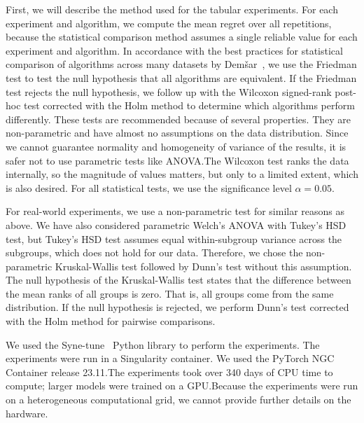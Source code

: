  First, we will describe the method used for the tabular experiments. For each experiment and algorithm, we compute the mean regret over all repetitions, because the statistical comparison method assumes a single reliable value for each experiment and algorithm. In accordance with the best practices for statistical comparison of algorithms across many datasets by Demšar~\cite{demvsar2006statistical}, we use the Friedman test to test the null hypothesis that all algorithms are equivalent. If the Friedman test rejects the null hypothesis, we follow up with the Wilcoxon signed-rank post-hoc test corrected with the Holm method to determine which algorithms perform differently. These tests are recommended because of several properties. They are non-parametric and have almost no assumptions on the data distribution. Since we cannot guarantee normality and homogeneity of variance of the results, it is safer not to use parametric tests like ANOVA.\@ The Wilcoxon test ranks the data internally, so the magnitude of values matters, but only to a limited extent, which is also desired. For all statistical tests, we use the significance level $\alpha=0.05$.

For real-world experiments, we use a non-parametric test for similar reasons as above. We have also considered parametric Welch's ANOVA with Tukey's HSD test, but Tukey's HSD test assumes equal within-subgroup variance across the subgroups, which does not hold for our data. Therefore, we chose the non-parametric Kruskal-Wallis test followed by Dunn's test without this assumption. The null hypothesis of the Kruskal-Wallis test states that the difference between the mean ranks of all groups is zero. That is, all groups come from the same distribution. If the null hypothesis is rejected, we perform Dunn's test corrected with the Holm method for pairwise comparisons.



We used the Syne-tune~\cite{salinas2022syne} Python library to perform the experiments. The experiments were run in a Singularity container. We used the PyTorch NGC Container release 23.11.\@ The experiments took over 340 days of CPU time to compute; larger models were trained on a GPU.\@ Because the experiments were run on a heterogeneous computational grid, we cannot provide further details on the hardware.


